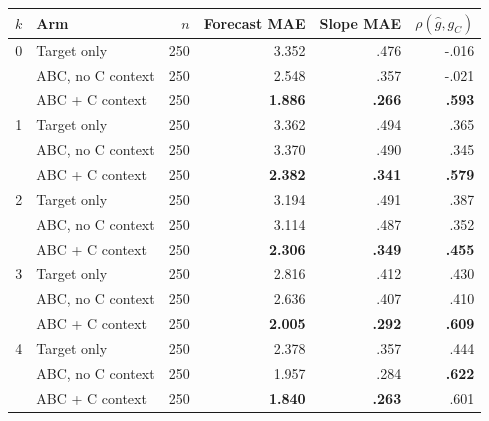 \begin{center}
\begin{minipage}{\linewidth}
\centering
{}
\label{tab:coin-city-recovery-kimi}
\small
\begin{tabular}{c l r r r r}
\toprule
$k$ & Arm & $n$ & Forecast MAE & Slope MAE & $\rho(\hat g,g_C)$ \\
\midrule
0 & Target only & 250 & 3.352 & .476 & -.016 \\
  & ABC, no C context & 250 & 2.548 & .357 & -.021 \\
  & ABC + C context & 250 & \textbf{1.886} & \textbf{.266} & \textbf{.593} \\
\midrule
1 & Target only & 250 & 3.362 & .494 & .365 \\
  & ABC, no C context & 250 & 3.370 & .490 & .345 \\
  & ABC + C context & 250 & \textbf{2.382} & \textbf{.341} & \textbf{.579} \\
\midrule
2 & Target only & 250 & 3.194 & .491 & .387 \\
  & ABC, no C context & 250 & 3.114 & .487 & .352 \\
  & ABC + C context & 250 & \textbf{2.306} & \textbf{.349} & \textbf{.455} \\
\midrule
3 & Target only & 250 & 2.816 & .412 & .430 \\
  & ABC, no C context & 250 & 2.636 & .407 & .410 \\
  & ABC + C context & 250 & \textbf{2.005} & \textbf{.292} & \textbf{.609} \\
\midrule
4 & Target only & 250 & 2.378 & .357 & .444 \\
  & ABC, no C context & 250 & 1.957 & .284 & \textbf{.622} \\
  & ABC + C context & 250 & \textbf{1.840} & \textbf{.263} & .601 \\
\bottomrule
\end{tabular}
\end{minipage}
\end{center}


